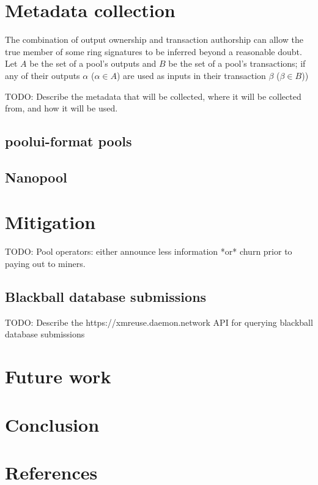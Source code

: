 \documentclass[notitlepage]{report}
\begin{document}

\section{Metadata collection}
\setcounter{chapter}{3}

The combination of output ownership and transaction authorship can allow the true member of some ring signatures to be inferred beyond a reasonable doubt.  Let $A$ be the set of a pool's outputs and $B$ be the set of a pool's transactions; if any of their outputs $\alpha$ ($\alpha \in A$) are used as inputs in their transaction $\beta$ ($\beta \in B$))

TODO: Describe the metadata that will be collected, where it will be collected from, and how it will be used.

\subsection{poolui-format pools}

\subsection{Nanopool} \label{Nanopool}

\section{Mitigation}

TODO: Pool operators: either announce less information *or* churn prior to paying out to miners.

\subsection{Blackball database submissions}

TODO: Describe the https://xmreuse.daemon.network API for querying blackball database submissions

\section{Future work}

\section{Conclusion}

\section{References}
\end{document}

